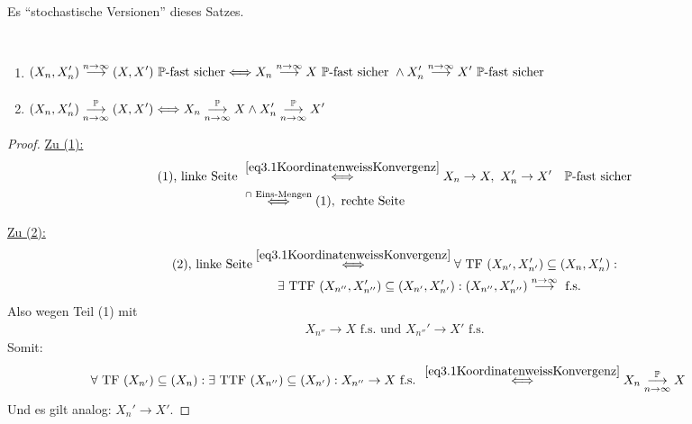 Es ``stochastische Versionen'' dieses Satzes.

\begin{satz}\label{satz3.15}\
\begin{enumerate}[label=(\arabic*)]
\item $\begin{aligned}
(X_n,X_n')
\stackrelnew{}{n\to\infty}{\longrightarrow}
(X,X')~\P\text{-fast sicher}
\Longleftrightarrow
X_n
\stackrelnew{}{n\to\infty}{\longrightarrow}
X~\P\text{-fast sicher }\wedge
X_n'
\stackrelnew{}{n\to\infty}{\longrightarrow}
X'~\P\text{-fast sicher}
\end{aligned}$
\item $\begin{aligned}
(X_n,X_n')
\stackrelnew{n\to\infty}{\P}{\longrightarrow}
(X,X')
\Longleftrightarrow
X_n
\stackrelnew{n\to\infty}{\P}{\longrightarrow}
X\wedge
X_n'
\stackrelnew{n\to\infty}{\P}{\longrightarrow}
X'
\end{aligned}$
\end{enumerate}
\end{satz}
\begin{proof}
\underline{Zu (1):}
\begin{align*}
(1)\text{, linke Seite }
&\stackrel{\eqref{eq3.1KoordinatenweissKonvergenz}}{\Longleftrightarrow}
X_n\to X,~X_n'\to X'\quad\P\text{-fast sicher}\\
&\stackrel{\cap\text{ Eins-Mengen}}{\Longleftrightarrow}
(1),\text{ rechte Seite}
\end{align*}

\underline{Zu (2):}
\begin{align*}
(2)\text{, linke Seite}
&\stackrel{\eqref{eq3.1KoordinatenweissKonvergenz}}{\Longleftrightarrow}
\forall\text{ TF }(X_{n'},X_{n'}')\subseteq(X_n,X_n'):\\
&\qquad\exists\text{ TTF }(X_{n''},X_{n''}')\subseteq(X_{n'},X_{n'}'):
(X_{n''},X_{n''}')\stackrel{n\to\infty}{\longrightarrow}\text{ f.s.}
\end{align*}
Also wegen Teil (1) mit
\begin{align*}
X_{n''}\to X\text{ f.s. und }X_{n''}'\to X'\text{ f.s.}
\end{align*}
Somit:
\begin{align*}
\forall\text{ TF }(X_{n'})\subseteq(X_n):\exists\text{ TTF }(X_{n''})\subseteq(X_{n'}):X_{n''}\to X\text{ f.s. }
&\stackrel{\eqref{eq3.1KoordinatenweissKonvergenz}}{\Longleftrightarrow}
X_n\stackrelnew{n\to\infty}{\P}{\longrightarrow} X
\end{align*}
Und es gilt analog: $X_n'\to X'$.
\end{proof}

